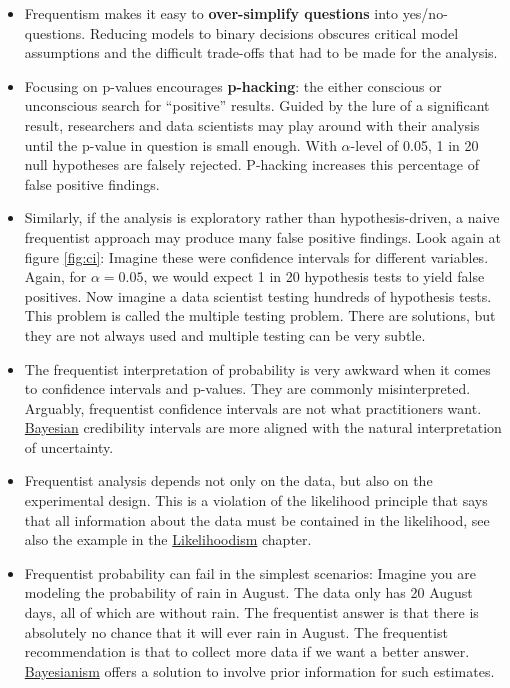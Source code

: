 \documentclass[
  10pt,
]{scrbook}
\providecommand{\tightlist}{%
  \setlength{\itemsep}{0pt}\setlength{\parskip}{0pt}}
\begin{document}
\begin{itemize}
\tightlist
\item
  Frequentism makes it easy to \textbf{over-simplify questions} into yes/no-questions. Reducing models to binary decisions obscures critical model assumptions and the difficult trade-offs that had to be made for the analysis.
\item
  Focusing on p-values encourages \textbf{p-hacking}: the either conscious or unconscious search for ``positive'' results. Guided by the lure of a significant result, researchers and data scientists may play around with their analysis until the p-value in question is small enough. With \(\alpha\)-level of 0.05, 1 in 20 null hypotheses are falsely rejected. P-hacking increases this percentage of false positive findings.
\item
  Similarly, if the analysis is exploratory rather than hypothesis-driven, a naive frequentist approach may produce many false positive findings. Look again at figure \ref{fig:ci}: Imagine these were confidence intervals for different variables. Again, for \(\alpha = 0.05\), we would expect 1 in 20 hypothesis tests to yield false positives. Now imagine a data scientist testing hundreds of hypothesis tests. This problem is called the multiple testing problem. There are solutions, but they are not always used and multiple testing can be very subtle.
\item
  The frequentist interpretation of probability is very awkward when it comes to confidence intervals and p-values. They are commonly misinterpreted. Arguably, frequentist confidence intervals are not what practitioners want. \protect\hyperlink{bayesian-inference}{Bayesian} credibility intervals are more aligned with the natural interpretation of uncertainty.
\item
  Frequentist analysis depends not only on the data, but also on the experimental design. This is a violation of the likelihood principle that says that all information about the data must be contained in the likelihood, see also the example in the \protect\hyperlink{likelihoodism}{Likelihoodism} chapter.
\item
  Frequentist probability can fail in the simplest scenarios: Imagine you are modeling the probability of rain in August. The data only has 20 August days, all of which are without rain. The frequentist answer is that there is absolutely no chance that it will ever rain in August. The frequentist recommendation is that to collect more data if we want a better answer. \protect\hyperlink{bayesian-inference}{Bayesianism} offers a solution to involve prior information for such estimates.

\end{itemize}
\end{document}
